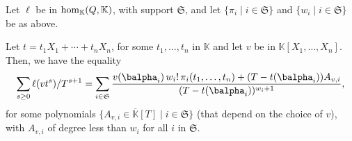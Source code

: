 \documentclass[12pt]{article}
\def\K{\mathbb{K}}
\def\K {\ensuremath{\mathbb{K}}}
\def\Kbar {{\ensuremath{\overline{\mathbb{K}}}}}
\begin{document}
\begin{lemma}\label{lemma:formula}
	Let $\ell$ be in ${\rm hom}_\K(Q,\K)$, with support $\mathfrak{S}$,
	and let $\{\pi_i \mid i \in \mathfrak{S}\}$ and $\{w_i \mid i \in
	\mathfrak{S}\}$ be as above.
	
	Let $t=t_1 X_1 + \cdots +t_n X_n$, for some $t_1,\dots,t_n$ in $\K$
	and let $v$ be in $\K[X_1,\dots,X_n]$. Then, we have the equality
	\begin{align}\label{eq:sumgenseries}
	\sum_{s \ge 0} \ell(v t^s)/T^{s+1} =
	\sum_{i \in \mathfrak{S}} \frac{
		v(\balpha_i)\, w_i!\, \pi_{i}(t_1,\dots,t_n)
		+ (T-t(\balpha_i))A_{v,i}}
	{(T-t(\balpha_i))^{w_{i}+1}},    
	\end{align}
	for some polynomials $\{A_{v,i} \in \Kbar[T] \mid i \in \mathfrak{S}\}$ (that
	depend on the choice of $v$), with $A_{v,i}$ of degree less than $w_i$ for all $i$ in
	$\mathfrak{S}$.
\end{lemma}
\end{document}
